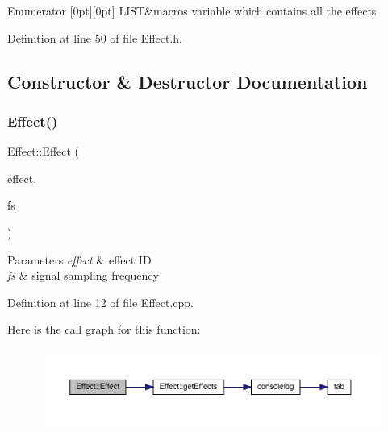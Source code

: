 \begin{DoxyEnumFields}{Enumerator}
[0pt][0pt]{}\mbox{\label{class_effect_a6422fe21e9e452943fbc3344884a6fedae2be861676276fd732d86f36e663295a}} 
L\+I\+ST&macros variable which contains all the effects \\
\hline

\end{DoxyEnumFields}


Definition at line 50 of file Effect.\+h.



\subsection{Constructor \& Destructor Documentation}
\mbox{\label{class_effect_a6ab7116f826b2607ada4630759f6afc5}} 
\subsubsection{\texorpdfstring{Effect()}{Effect()}\hspace{0.1cm}{\footnotesize\ttfamily [1/2]}}
{\footnotesize\ttfamily Effect\+::\+Effect (\begin{DoxyParamCaption}\item[{\hyperlink{class_effect_a6422fe21e9e452943fbc3344884a6fed}{Effect\+::effect\+ID}}]{effect,  }\item[{int}]{fs }\end{DoxyParamCaption})}


\begin{DoxyParams}{Parameters}
{\em effect} & effect ID \\
\hline
{\em fs} & signal sampling frequency \\
\hline
\end{DoxyParams}


Definition at line 12 of file Effect.\+cpp.

Here is the call graph for this function\+:
\nopagebreak
\begin{figure}[H]
\begin{center}
\leavevmode
\includegraphics[width=350pt]{class_effect_a6ab7116f826b2607ada4630759f6afc5_cgraph}
\end{center}
\end{figure}
\mbox{\label{class_effect_a2fbf9d2526c65543157370f68cbed091}} 
